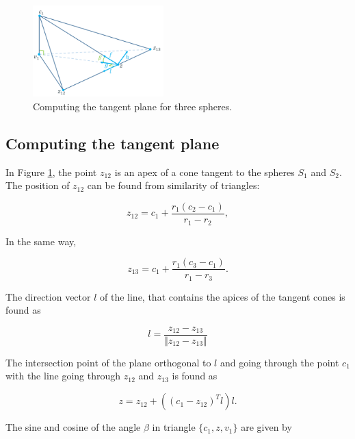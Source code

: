 \documentclass[10pt,journal,a4paper]{IEEEtran}
\begin{document}
\begin{figure}[h!] 
	\centering
	\hspace{-2em}
	\includegraphics[width=0.45\textwidth]{figures/projection_convtriangle.png}
	\caption{Computing the tangent plane for three spheres.}
	\label{fig:projection_convtriangle}
\end{figure}

\subsection{Computing the tangent plane}

In Figure \ref{fig:projection_convtriangle}, the point $z_{12}$ is an apex of a cone tangent to the spheres $S_1$ and $S_2$. The position of $z_{12}$ can be found from similarity of triangles:

\begin{equation}
	z_{12} = c_1 +\frac{r_1 (c_2 - c_1)}{r_1 - r_2},
\end{equation}

In the same way,

\begin{equation}
	z_{13} = c_1 +\frac{r_1 (c_3 - c_1)}{r_1 - r_3}.
\end{equation}

The direction vector $l$ of the line, that contains the apices of the tangent cones is found as

\begin{equation}
	l = \frac{z_{12} - z_{13}} {\Vert z_{12} - z_{13} \Vert} 
\end{equation}

The intersection point of the plane orthogonal to $l$ and going through the point $c_1$ with the line going through $z_{12}$ and $z_{13}$ is found as

\begin{equation}
z = z_{12} + ((c_1 - z_{12})^T l )l.
\end{equation}

The sine and cosine of the angle $\beta$ in triangle $\{c_1, z, v_1\}$ are given by 
\end{document}
